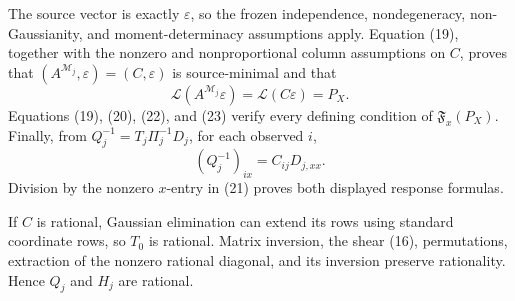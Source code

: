 The source vector is exactly \(\varepsilon\), so the frozen independence, nondegeneracy, non-Gaussianity, and moment-determinacy assumptions apply. Equation (19), together with the nonzero and nonproportional column assumptions on \(C\), proves that \((A^{\mathcal M_j},\varepsilon)=(C,\varepsilon)\) is source-minimal and that
\[
\mathcal L(A^{\mathcal M_j}\varepsilon)=\mathcal L(C\varepsilon)=P_X. \tag{23}
\]
Equations (19), (20), (22), and (23) verify every defining condition of \(\mathfrak F_x(P_X)\). Finally, from \(Q_j^{-1}=T_j\Pi_j^{-1}D_j\), for each observed \(i\),
\[
(Q_j^{-1})_{ix}=C_{ij}D_{j,xx}.
\]
Division by the nonzero \(x\)-entry in (21) proves both displayed response formulas.

If \(C\) is rational, Gaussian elimination can extend its rows using standard coordinate rows, so \(T_0\) is rational. Matrix inversion, the shear (16), permutations, extraction of the nonzero rational diagonal, and its inversion preserve rationality. Hence \(Q_j\) and \(H_j\) are rational.